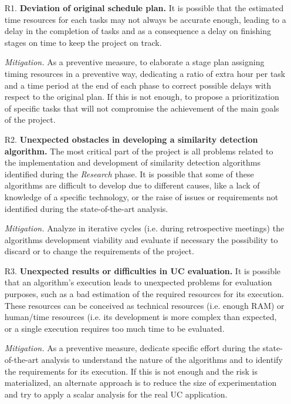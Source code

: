 \documentclass[11pt]{article}
\begin{document}
\begin{itemize}

\item[R1.] \textbf{Deviation of original schedule plan.} It is possible that the estimated time resources for each tasks may not always be accurate enough, leading to a delay in the completion of tasks and as a consequence a delay on finishing stages on time to keep the project on track.

\textit{Mitigation.} As a preventive measure, to elaborate a stage plan assigning timing resources in a preventive way, dedicating a ratio of extra hour per task and a time period at the end of each phase to correct possible delays with respect to the original plan. If this is not enough, to propose a prioritization of specific tasks that will not compromise the achievement of the main goals of the project.

\item[R2.] \textbf{Unexpected obstacles in developing a similarity detection algorithm.} The most critical part of the project is all problems related to the implementation and development of similarity detection algorithms identified during the \textit{Research} phase. It is possible that some of these algorithms are difficult to develop due to different causes, like a lack of knowledge of a specific technology, or the raise of issues or requirements not identified during the state-of-the-art analysis.

\textit{Mitigation.} Analyze in iterative cycles (i.e. during retrospective meetings) the algorithms development viability and evaluate if necessary the possibility to discard or to change the requirements of the project. 

\item[R3.] \textbf{Unexpected results or difficulties in UC evaluation.} It is possible that an algorithm's execution leads to unexpected problems for evaluation purposes, such as a bad estimation of the required resources for its execution. These resources can be conceived as technical resources (i.e. enough RAM) or human/time resources (i.e. its development is more complex than expected, or a single execution requires too much time to be evaluated.

\textit{Mitigation.} As a preventive measure, dedicate specific effort during the state-of-the-art analysis to understand the nature of the algorithms and to identify the requirements for its execution. If this is not enough and the risk is materialized, an alternate approach is to reduce the size of experimentation and try to apply a scalar analysis for the real UC application.
\end{itemize}
\end{document}
